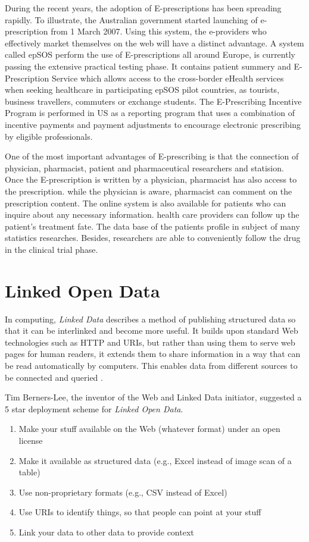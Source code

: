 \documentclass[10pt, conference, compsocconf]{IEEEtran}
\begin{document}
During the recent years, the adoption of E-prescriptions has been spreading rapidly.
To illustrate, the Australian government started launching of e-prescription from 1 March 2007.
Using this system, the e-providers who effectively market themselves on the web will have a distinct advantage\cite{Ravichandran}.
A system called epSOS perform the use of E-prescriptions all around Europe, is currently passing the extensive practical testing phase.
It contains patient summery and E-Prescription Service which allows access to the cross-border eHealth services when seeking healthcare in participating epSOS pilot countries, as tourists, business travellers, commuters or exchange students.
The E-Prescribing Incentive Program is performed in US as a reporting program that uses a combination of incentive payments and payment adjustments to encourage electronic prescribing by eligible professionals.

One of the most important advantages of E-prescribing is that the connection of physician, pharmacist, patient and pharmaceutical researchers and statision.
Once the E-prescription is written by a physician, pharmacist has also access to the prescription.
while the physician is aware, pharmacist can comment on the prescription content.
The online system is also available for patients who can inquire about any necessary information.
health care providers can follow up the patient's treatment fate.
The data base of the patients profile in subject of many statistics researches.
Besides, researchers are able to conveniently follow the drug in the clinical trial phase.


\section{Linked Open Data}
\label{sec:lod}
In computing, \emph{Linked Data} describes a method of publishing structured data so that it can be interlinked and become more useful.
It builds upon standard Web technologies such as HTTP and URIs, but rather than using them to serve web pages for human readers, it extends them to share information in a way that can be read automatically by computers.
This enables data from different sources to be connected and queried \cite{linkeddata}.

Tim Berners-Lee, the inventor of the Web and Linked Data initiator, suggested a 5 star deployment scheme for \emph{Linked Open Data}.

\begin{enumerate}
  \item  Make your stuff available on the Web (whatever format) under an open license
  \item  Make it available as structured data (e.g., Excel instead of image scan of a table)
  \item  Use non-proprietary formats (e.g., CSV instead of Excel)
  \item  Use URIs to identify things, so that people can point at your stuff
  \item  Link your data to other data to provide context
\end{enumerate}
\end{document}
